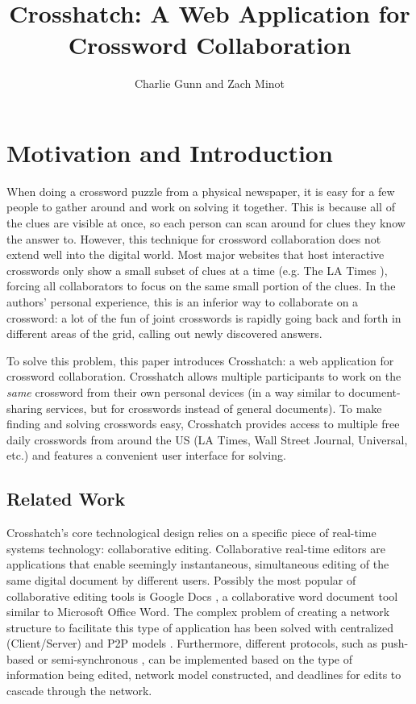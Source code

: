 \documentclass{article}
\author{Charlie Gunn and Zach Minot}
\title{Crosshatch: A Web Application for Crossword Collaboration}
\begin{document}
\maketitle

\section{Motivation and Introduction}
\label{mot}
When doing a crossword puzzle from a physical newspaper, it is easy for a few people to gather around and work on solving it together.
This is because all of the clues are visible at once, so each person can scan around for clues they know the answer to. However, this technique
for crossword collaboration does not extend well into the digital world. Most major websites that host interactive crosswords only show a small subset of
clues at a time (e.g. The LA Times \cite{latcrossword}), forcing all collaborators to focus on the same small portion of the clues. In the authors' personal experience,
this is an inferior way to collaborate on a crossword: a lot of the fun of joint crosswords is rapidly going back and forth in different areas
of the grid, calling out newly discovered answers.

To solve this problem, this paper introduces Crosshatch: a web application for crossword collaboration. Crosshatch
allows multiple participants to work on the \textit{same} crossword from their own personal devices (in a way similar to document-sharing services,
but for crosswords instead of general documents). To make finding and solving crosswords easy, Crosshatch provides access to multiple free daily crosswords
from around the US (LA Times, Wall Street Journal, Universal, etc.) and features a convenient user interface for solving.

\newpage
\subsection{Related Work}
Crosshatch's core technological design relies on a specific piece of real-time systems technology: collaborative editing.
Collaborative real-time editors are applications that enable seemingly instantaneous, simultaneous editing
of the same digital document by different users.
Possibly the most popular of collaborative editing tools is Google Docs \cite{googledocs}, a collaborative
word document tool similar to Microsoft Office Word.
The complex problem of creating a network structure to facilitate this type of application has been solved with centralized (Client/Server)
and P2P models \cite{p2p} \cite{p2p2}.
Furthermore, different protocols, such as push-based \cite{pushbased} or semi-synchronous \cite{semisynchronous}, can be implemented based on the type of information being edited,
network model constructed, and deadlines for edits to cascade through the network.
\end{document}
